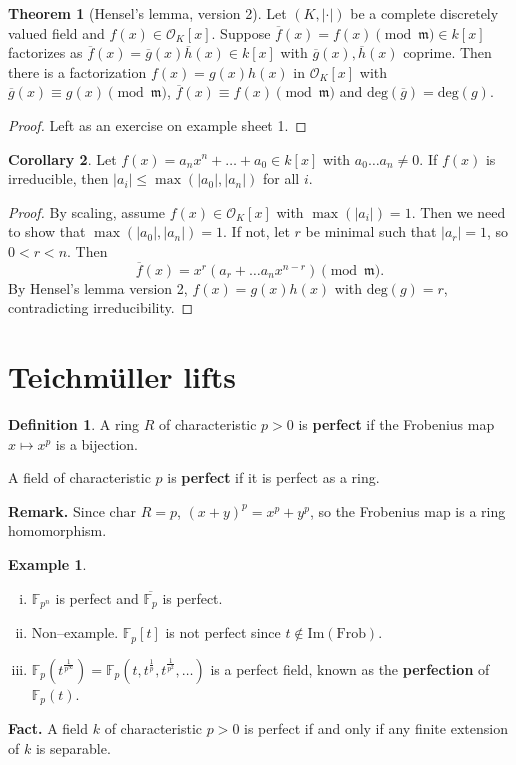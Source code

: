 \documentclass{article}
\theoremstyle{definition}
\newtheorem{theorem}{Theorem}[section]
\newtheorem{cor}[theorem]{Corollary}
\newtheorem{example}{Example}[section]
\newtheorem{defn}{Definition}[section]
\begin{document}
\begin{theorem}[Hensel's lemma, version 2]
    Let $(K, |\cdot|)$ be a complete discretely valued field and $f(x) \in \mathcal{O}_K[x]$. Suppose $\overline{f}(x) = f(x) \pmod{\mathfrak{m}} \in k[x]$ factorizes as $\overline{f}(x) = \overline{g}(x)\overline{h}(x) \in k[x]$ with $\overline{g}(x), \overline{h}(x)$ coprime. Then there is a factorization $f(x) = g(x)h(x)$ in $\mathcal{O}_K[x]$ with $\overline{g}(x) \equiv g(x) \pmod{\mathfrak{m}}$, $\overline{f}(x) \equiv f(x) \pmod{\mathfrak{m}}$ and $\text{deg}(\overline{g}) = \text{deg}(g)$.
\end{theorem}
\begin{proof}
    Left as an exercise on example sheet 1.
\end{proof}


\begin{cor}
    Let $f(x) = a_nx^n + \ldots + a_0 \in k[x]$ with $a_0 \ldots a_n \neq 0$. If $f(x)$ is irreducible, then $|a_i|\le \max(|a_0|,|a_n|)$ for all $i$.
\end{cor}
\begin{proof}
    By scaling, assume $f(x) \in \mathcal{O}_K[x]$ with $\max(|a_i|) = 1$. Then we need to show that $\max(|a_0|,|a_n|)=1$. If not, let $r$ be minimal such that $|a_r|=1$, so $0<r<n$. Then $$\overline{f}(x) = x^r(a_r + \ldots a_n x^{n-r}) \pmod{\mathfrak{m}}.$$
    By Hensel's lemma version 2, $f(x)=g(x)h(x)$ with $\text{deg}(g)=r$, contradicting irreducibility.
\end{proof}

\section{Teichmüller lifts}
\begin{defn}
    A ring $R$ of characteristic $p>0$ is \textbf{perfect} if the Frobenius map $x \mapsto x^p$ is a bijection.
    \vspace{1mm}
     
    A field of characteristic $p$ is \textbf{perfect} if it is perfect as a ring.
\end{defn}
\textbf{Remark.} Since $\text{char }R = p$, $(x+y)^p = x^p + y^p$, so the Frobenius map is a ring homomorphism.

\begin{example}
    \begin{enumerate}[(i)]
        \item $\mathbb{F}_{p^n}$ is perfect and $\overline{\mathbb{F}_p}$ is perfect.
        \item Non--example. $\mathbb{F}_p[t]$ is not perfect since $t \not\in \text{Im}(\text{Frob})$.
        \item $\mathbb{F}_p(t^{\frac{1}{p^{\infty}}}) = \mathbb{F}_p\left(t,t^{\frac{1}{p}},t^{\frac{1}{p^2}},\ldots \right)$ is a perfect field, known as the \textbf{perfection} of $\mathbb{F}_p(t)$.
    \end{enumerate}
\end{example}
\textbf{Fact.} A field $k$ of characteristic $p>0$ is perfect if and only if any finite extension of $k$ is separable.
\end{document}
